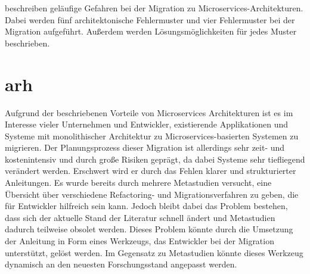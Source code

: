  beschreiben geläufige Gefahren bei der Migration zu Microservices-Architekturen.
Dabei  werden fünf architektonische Fehlermuster und vier Fehlermuster bei der Migration aufgeführt.
Außerdem werden Lösungsmöglichkeiten für jedes Muster beschrieben.

%
%

\section{\acrfull{arh}}

Aufgrund der beschriebenen Vorteile von Microservices Architekturen ist es im Interesse vieler Unternehmen und Entwickler, existierende Applikationen und Systeme mit monolithischer Architektur zu Microservices-basierten Systemen zu migrieren.
Der Planungsprozess dieser Migration ist allerdings sehr zeit- und kostenintensiv und durch große Risiken geprägt, da dabei Systeme sehr tiefliegend verändert werden.
Erschwert wird er durch das Fehlen klarer und strukturierter Anleitungen.
Es wurde bereits durch mehrere Metastudien versucht, eine Übersicht über verschiedene Refactoring- und Migrationsverfahren zu geben, die für Entwickler hilfreich sein kann.
Jedoch bleibt dabei das Problem bestehen, dass sich der aktuelle Stand der Literatur schnell ändert und Metastudien dadurch teilweise obsolet werden.
Dieses Problem könnte durch die Umsetzung der Anleitung in Form eines Werkzeugs, das Entwickler bei der Migration unterstützt, gelöst werden.
Im Gegensatz zu Metastudien könnte dieses Werkzeug dynamisch an den neuesten Forschungsstand angepasst werden.

